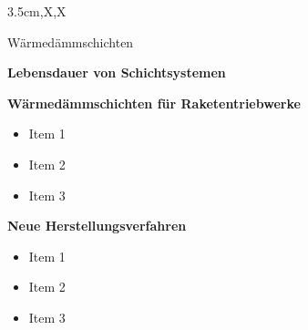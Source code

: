 \documentclass[%
landscape,violet,
  a3paper,%
  arial,style=scifi%
  ]{tubsposter}
\begin{document}
\begin{tubsposter}{3.5cm,X,X}

  \showtubslogo[left]


  \begin{posterrow}[bgcolor=tuViolet100]
    \vfill


     \LARGE   \color{tuWhite} Wärmedämmschichten\\

    \vfill
  \end{posterrow}
  \begin{posterrow}[X,X,X]
\begin{postercol}
    \large\textbf{Lebensdauer von Schichtsystemen}

  \end{postercol}
\begin{postercol}
    \large\textbf{Wärmedämmschichten für Raketentriebwerke}
    \begin{itemize}
      \item Item 1
      \item Item 2
      \item Item 3
    \end{itemize}
  \end{postercol}
\begin{postercol}
    \large\textbf{Neue Herstellungsverfahren}

    \begin{itemize}
      \item Item 1
      \item Item 2
      \item Item 3
    \end{itemize}
  \end{postercol}
\end{posterrow}
\end{tubsposter}
\end{document}
